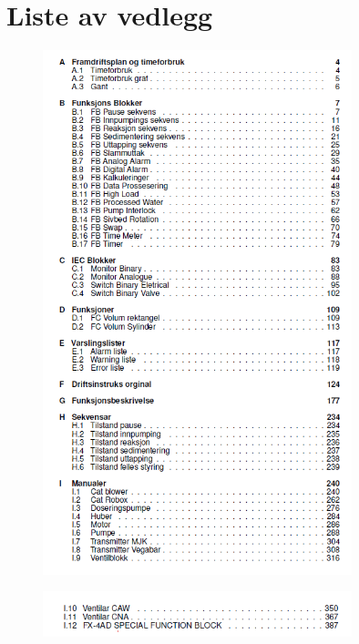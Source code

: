 
\chapter*{Liste av vedlegg}
\thispagestyle{fancy}

\begin{figure}[H]
    \centering
    \includegraphics[width=0.8\textwidth]{Appendix/ListeAvVedlegg1.png}
    \caption*{} %
    \label{fig:VedlegListe1}
\end{figure}

\begin{figure}[H]
    \centering
    \includegraphics[width=0.8\textwidth]{Appendix/ListeAvVedlegg2.png}
    \caption*{} %
    \label{fig:VedlegListe2}
\end{figure}